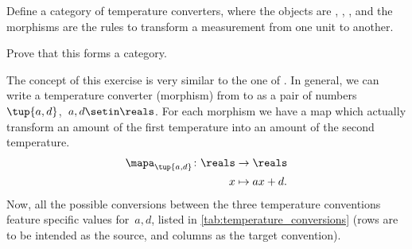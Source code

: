 \begin{exercise}
    \label{ex:temperatures}
    Define a category of temperature converters, where the objects are , , , and the morphisms are the rules to transform a measurement from one unit to another.

    Prove that this forms a category.
\end{exercise}
\begin{solution}
    The concept of this exercise is very similar to the one of \Curr.
    In general, we can write a temperature converter (morphism) from  to  as a pair of numbers~$\tup{a,d}$,~$a,d\setin \reals$.
    For each morphism we have a map which actually transform an amount of the first temperature into an amount of the second temperature.
    \begin{equation*}
        \begin{aligned}
            \mapa_{\tup{a,d}}\colon \reals & \to \reals \\
            x                              & \mapsto ax+d.
        \end{aligned}
    \end{equation*}
    Now, all the possible conversions between the three temperature conventions feature specific values for~$a,d$, listed in \cref{tab:temperature_conversions} (rows are to be intended as the source, and columns as the target convention).


\end{solution}
